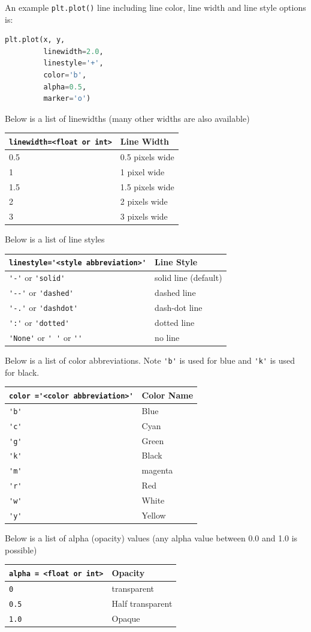 \documentclass{book}
\begin{document}
An example \lstinline!plt.plot()! line including line color, line width
and line style options is:

\begin{lstlisting}[language=Python]
plt.plot(x, y,
         linewidth=2.0,
         linestyle='+',
         color='b',
         alpha=0.5,
         marker='o')
\end{lstlisting}

Below is a list of linewidths (many other widths are also available)

\begin{longtable}[]{@{}ll@{}}
\toprule
\lstinline!linewidth=<float or int>! & Line Width\tabularnewline
\midrule
\endhead
0.5 & 0.5 pixels wide\tabularnewline
1 & 1 pixel wide\tabularnewline
1.5 & 1.5 pixels wide\tabularnewline
2 & 2 pixels wide\tabularnewline
3 & 3 pixels wide\tabularnewline
\bottomrule
\end{longtable}

Below is a list of line styles

\begin{longtable}[]{@{}ll@{}}
\toprule
\lstinline!linestyle='<style abbreviation>'! & Line Style\tabularnewline
\midrule
\endhead
\lstinline!'-'! or \lstinline!'solid'! & solid line
(default)\tabularnewline
\lstinline!'--'! or \lstinline!'dashed'! & dashed line\tabularnewline
\lstinline!'-.'! or \lstinline!'dashdot'! & dash-dot line\tabularnewline
\lstinline!':'! or \lstinline!'dotted'! & dotted line\tabularnewline
\lstinline!'None'! or \lstinline!' '! or \lstinline!''! & no
line\tabularnewline
\bottomrule
\end{longtable}

Below is a list of color abbreviations. Note \lstinline!'b'! is used for
blue and \lstinline!'k'! is used for black.

\begin{longtable}[]{@{}ll@{}}
\toprule
\lstinline!color ='<color abbreviation>'! & Color Name\tabularnewline
\midrule
\endhead
\lstinline!'b'! & Blue\tabularnewline
\lstinline!'c'! & Cyan\tabularnewline
\lstinline!'g'! & Green\tabularnewline
\lstinline!'k'! & Black\tabularnewline
\lstinline!'m'! & magenta\tabularnewline
\lstinline!'r'! & Red\tabularnewline
\lstinline!'w'! & White\tabularnewline
\lstinline!'y'! & Yellow\tabularnewline
\bottomrule
\end{longtable}

Below is a list of alpha (opacity) values (any alpha value between 0.0
and 1.0 is possible)

\begin{longtable}[]{@{}ll@{}}
\toprule
\lstinline!alpha = <float or int>! & Opacity\tabularnewline
\midrule
\endhead
\lstinline!0! & transparent\tabularnewline
\lstinline!0.5! & Half transparent\tabularnewline
\lstinline!1.0! & Opaque\tabularnewline
\bottomrule
\end{longtable}
\end{document}
